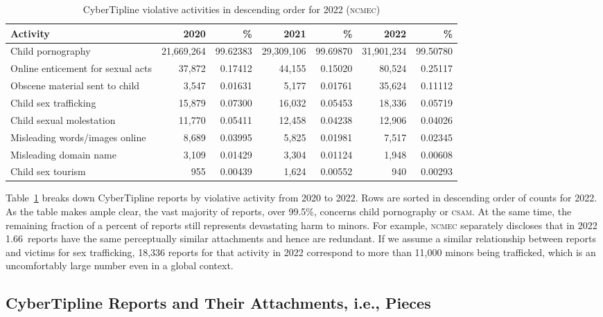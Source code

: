 \documentclass[nonacm,screen]{acmart}
\newcommand\V[1]{\textsc{\MakeLowercase{#1}}}
\begin{document}
\begin{table}
\centering\libertineLF
\caption{CyberTipline violative activities in descending order for 2022 (\V{NCMEC})}
\label{tab:report-contents}
\begin{tabular}{l|rr|rr|rr}
\textbf{Activity}
& \textbf{2020} & \textbf{\%}
& \textbf{2021} & \textbf{\%}
& \textbf{2022} & \textbf{\%}
\\ \hline
Child pornography & 21,669,264 & 99.62383 & 29,309,106 & 99.69870 & 31,901,234 & 99.50780 \\
Online enticement for sexual acts & 37,872 & 0.17412 & 44,155 & 0.15020 & 80,524 & 0.25117 \\
Obscene material sent to child & 3,547 & 0.01631 & 5,177 & 0.01761 & 35,624 & 0.11112 \\
Child sex trafficking & 15,879 & 0.07300 & 16,032 & 0.05453 & 18,336 & 0.05719 \\
Child sexual molestation & 11,770 & 0.05411 & 12,458 & 0.04238 & 12,906 & 0.04026 \\
Misleading words/images online & 8,689 & 0.03995 & 5,825 & 0.01981 & 7,517 & 0.02345 \\
Misleading domain name & 3,109 & 0.01429 & 3,304 & 0.01124 & 1,948 & 0.00608 \\
Child sex tourism & 955 & 0.00439 & 1,624 & 0.00552 & 940 & 0.00293 \\
\end{tabular}
\end{table}

Table~\ref{tab:report-contents} breaks down CyberTipline reports by violative
activity from 2020 to 2022. Rows are sorted in descending order of counts for
2022. As the table makes ample clear, the vast majority of reports, over 99.5\%,
concerns child pornography or \V{CSAM}. At the same time, the remaining fraction
of a percent of reports still represents devastating harm to minors. For
example, \V{NCMEC} separately discloses that in 2022 1.66~reports have the same
perceptually similar attachments and hence are redundant. If we assume a similar
relationship between reports and victims for sex trafficking, 18,336 reports for
that activity in 2022 correspond to more than 11,000 minors being trafficked,
which is an uncomfortably large number even in a global context.


\subsection{CyberTipline Reports and Their Attachments, i.e., Pieces}
\label{sec:pieces-and-reports}
\end{document}

